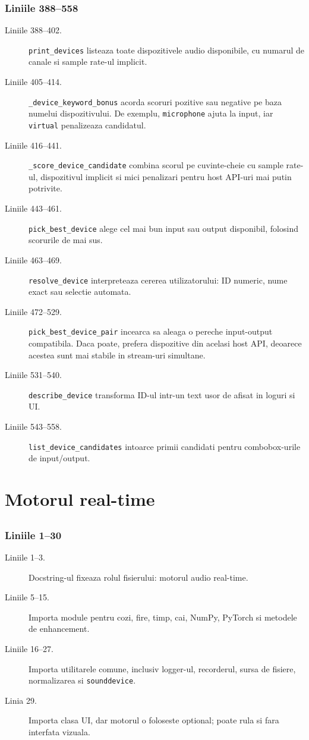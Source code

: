\documentclass[12pt,a4paper]{report}
\newcommand{\filetitle}[1]{\section*{\texttt{\detokenize{#1}}}}
\newcommand{\chunk}[3]{\subsection*{Liniile #2--#3}}
\begin{document}
\chunk{../src/tools/realtime/common.py}{388}{558}

\begin{description}
    \item[Liniile 388--402.] \texttt{print\_devices} listeaza toate dispozitivele
    audio disponibile, cu numarul de canale si sample rate-ul implicit.
    \item[Liniile 405--414.] \texttt{\_device\_keyword\_bonus} acorda scoruri pozitive
    sau negative pe baza numelui dispozitivului. De exemplu, \texttt{microphone}
    ajuta la input, iar \texttt{virtual} penalizeaza candidatul.
    \item[Liniile 416--441.] \texttt{\_score\_device\_candidate} combina scorul pe
    cuvinte-cheie cu sample rate-ul, dispozitivul implicit si mici penalizari
    pentru host API-uri mai putin potrivite.
    \item[Liniile 443--461.] \texttt{pick\_best\_device} alege cel mai bun input sau
    output disponibil, folosind scorurile de mai sus.
    \item[Liniile 463--469.] \texttt{resolve\_device} interpreteaza cererea
    utilizatorului: ID numeric, nume exact sau selectie automata.
    \item[Liniile 472--529.] \texttt{pick\_best\_device\_pair} incearca sa aleaga
    o pereche input-output compatibila. Daca poate, prefera dispozitive din acelasi
    host API, deoarece acestea sunt mai stabile in stream-uri simultane.
    \item[Liniile 531--540.] \texttt{describe\_device} transforma ID-ul intr-un text
    usor de afisat in loguri si UI.
    \item[Liniile 543--558.] \texttt{list\_device\_candidates} intoarce primii
    candidati pentru combobox-urile de input/output.
\end{description}

\chapter{Motorul real-time}

\filetitle{src/tools/realtime/engine.py}

\chunk{../src/tools/realtime/engine.py}{1}{30}

\begin{description}
    \item[Liniile 1--3.] Docstring-ul fixeaza rolul fisierului: motorul audio
    real-time.
    \item[Liniile 5--15.] Importa module pentru cozi, fire, timp, cai, NumPy,
    PyTorch si metodele de enhancement.
    \item[Liniile 16--27.] Importa utilitarele comune, inclusiv logger-ul,
    recorderul, sursa de fisiere, normalizarea si \texttt{sounddevice}.
    \item[Linia 29.] Importa clasa UI, dar motorul o foloseste optional; poate
    rula si fara interfata vizuala.
\end{description}
\end{document}
